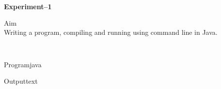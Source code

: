 \documentclass[11pt]{ipu-ai}
\renewcommand{\experiment}[2]{%
    \newpage%
    \begin{center}%
        \textbf{\Huge Experiment--#1}\\[30pt]%
    \end{center}%
    \begin{tabularsection}{Aim}%
        ~\\#2\\%
    \end{tabularsection}}
\begin{document}
    \maketitle
    

    \experiment{1}{Writing a program, compiling and running using command line in Java.}\\%
    \begin{code}
        {Program}{java}
    \end{code}%
    \begin{code}
        {Output}{text}
    \end{code}
    \newpage%

\end{document}
